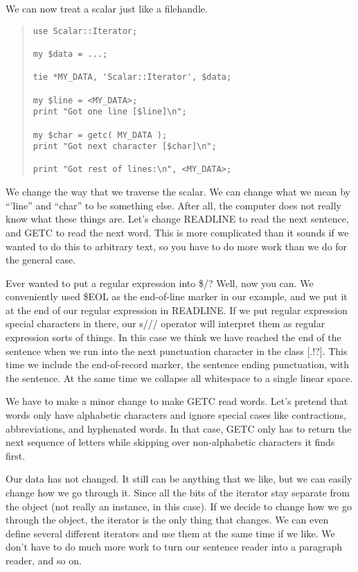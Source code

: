 We can now treat a scalar just like a filehandle.

\begin{quote}
\begin{verbatim}
use Scalar::Iterator;

my $data = ...;

tie *MY_DATA, 'Scalar::Iterator', $data;

my $line = <MY_DATA>;
print "Got one line [$line]\n";

my $char = getc( MY_DATA );
print "Got next character [$char]\n";

print "Got rest of lines:\n", <MY_DATA>;

\end{verbatim}
\end{quote}

We change the way that we traverse the scalar.  We can change
what we mean by ``'line'' and ``char'' to be something else.  After
all, the computer does not really know what these things are.  Let's
change READLINE to read the next sentence, and GETC to read the next
word.  This is more complicated than it sounds if we wanted to do this
to arbitrary text, so you have to do more work than we do for the
general case.

Ever wanted to put a regular expression into \$/?  Well, now you can.
We conveniently used \$EOL as the end-of-line marker in our example,
and we put it at the end of our regular expression in READLINE.  If
we put regular expression special characters in there, our s/// operator
will interpret them as regular expression sorts of things.  In this 
case we think we have reached the end of the sentence when we run
into the next punctuation character in the class [.!?].  This time
we include the end-of-record marker, the sentence ending punctuation,
with the sentence. At the same time we collapse all whitespace to a single
linear space.

We have to make a minor change to make GETC read words.  Let's pretend
that words only have alphabetic characters and ignore special cases
like contractions, abbreviations, and hyphenated words.  In that case,
GETC only has to return the next sequence of letters while skipping over
non-alphabetic characters it finds first.

Our data has not changed.  It still can be anything that we like, but
we can easily change how we go through it.  Since all the bits of the
iterator stay separate from the object (not really an instance, in this
case).  If we decide to change how we go through the object, the iterator
is the only thing that changes.  We can even define several different
iterators and use them at the same time if we like.  We don't have to do
much more work to turn our sentence reader into a paragraph reader, and 
so on.

